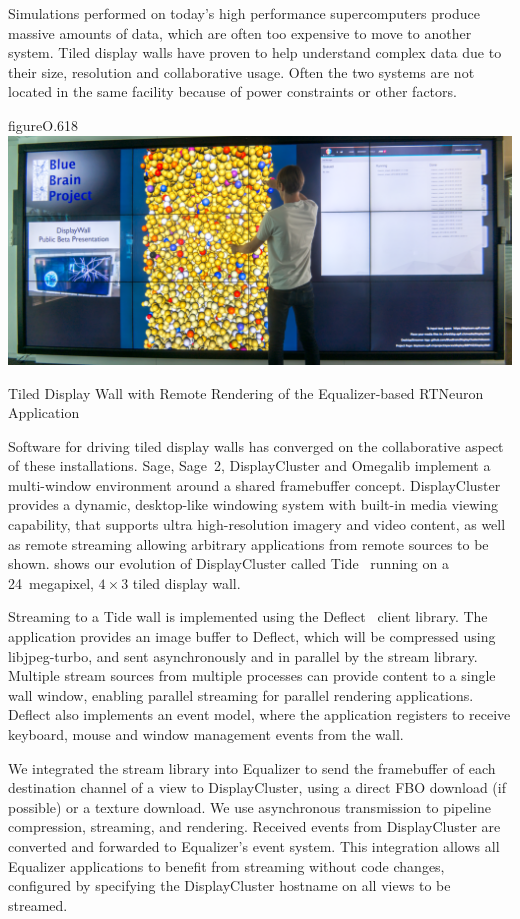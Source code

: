 Simulations performed on today’s high performance supercomputers produce
massive amounts of data, which are often too expensive to move to another
system. Tiled display walls have proven to help understand complex data due
to their size, resolution and collaborative usage. Often the two systems are
not located in the same facility because of power constraints or other factors.

\begin{wrapfloat}{figure}{O}{.618\textwidth}
  \includegraphics[width=.618\textwidth]{images/tide}
  {\caption{\label{fTide}Tiled Display Wall with Remote Rendering of the Equalizer-based RTNeuron Application}}
\end{wrapfloat}

Software for driving tiled display walls has converged on the collaborative
aspect of these installations. Sage, Sage~2, DisplayCluster and Omegalib
implement a multi-window environment around a shared framebuffer concept.
DisplayCluster provides a dynamic, desktop-like windowing system with built-in
media viewing capability, that supports ultra high-resolution imagery and video
content, as well as remote streaming allowing arbitrary applications from
remote sources to be shown.  shows our evolution of DisplayCluster
called Tide~\cite{tide} running on a 24~megapixel, $4\times 3$ tiled display
wall.

Streaming to a Tide wall is implemented using the Deflect~\cite{deflect} client
library. The application provides an image buffer to Deflect, which will be
compressed using libjpeg-turbo, and sent asynchronously and in parallel by the
stream library. Multiple stream sources from multiple processes can provide
content to a single wall window, enabling parallel streaming for parallel
rendering applications. Deflect also implements an event model, where the
application registers to receive keyboard, mouse and window management events
from the wall.

We integrated the stream library into Equalizer to send the framebuffer of each
destination channel of a view to DisplayCluster, using a direct FBO download
(if possible) or a texture download. We use asynchronous transmission to
pipeline compression, streaming, and rendering. Received events from
DisplayCluster are converted and forwarded to Equalizer’s event system. This
integration allows all Equalizer applications to benefit from streaming without
code changes, configured by specifying the DisplayCluster hostname on all views
to be streamed.


